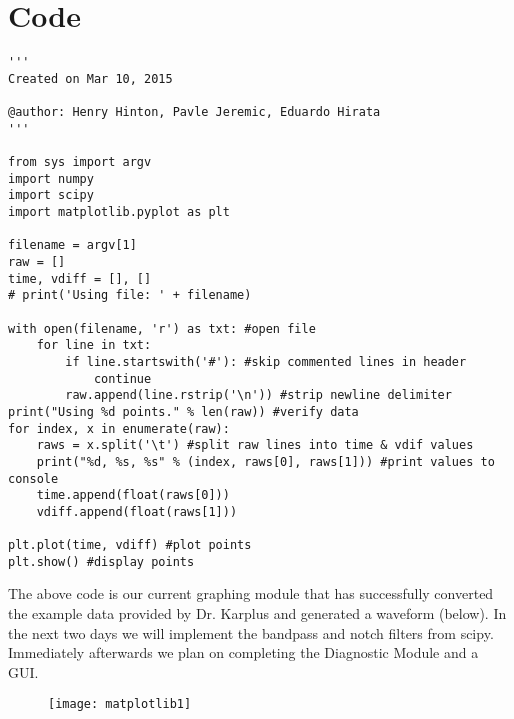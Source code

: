 \documentclass[11pt, oneside]{article}   	%
\begin{document}
\section{Code}
\begin{lstlisting}
'''
Created on Mar 10, 2015

@author: Henry Hinton, Pavle Jeremic, Eduardo Hirata
'''

from sys import argv
import numpy
import scipy
import matplotlib.pyplot as plt

filename = argv[1]
raw = []
time, vdiff = [], []
# print('Using file: ' + filename)

with open(filename, 'r') as txt: #open file
    for line in txt:
        if line.startswith('#'): #skip commented lines in header
            continue
        raw.append(line.rstrip('\n')) #strip newline delimiter
print("Using %d points." % len(raw)) #verify data
for index, x in enumerate(raw):
    raws = x.split('\t') #split raw lines into time & vdif values
    print("%d, %s, %s" % (index, raws[0], raws[1])) #print values to console
    time.append(float(raws[0]))
    vdiff.append(float(raws[1]))
    
plt.plot(time, vdiff) #plot points
plt.show() #display points
\end{lstlisting}
\pagebreak
\par The above code is our current graphing module that has successfully converted the example data \cite{karcode} provided by Dr. Karplus \cite{karptalk} and generated a waveform (below). In the next two days we will implement the bandpass and notch filters from scipy. Immediately afterwards we plan on completing the Diagnostic Module and a GUI.

\begin{figure}[htb!]
\centering
\texttt{[image: matplotlib1]}
\end{figure}
\end{document}
